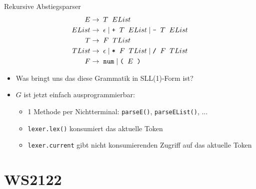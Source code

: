 \documentclass{beamer}
\begin{document}
\begin{frame}{Rekursive Abstiegsparser}
	\footnotesize
	\begin{align*}
		E     \to & \;\; T \;\; EList\\
		EList \to & \;\; \epsilon \mid \textrm{\texttt{+}} \;\; T \;\; EList \mid \textrm{\texttt{-}} \;\; T \;\; EList\\
		T     \to & \;\; F \;\; TList\\
		TList \to & \;\; \epsilon \mid \textrm{\texttt{*}} \;\; F \;\; TList \mid \textrm{\texttt{/}} \;\; F \;\; TList\\
		F \to & \;\; \textrm{\texttt{num}} \; | \; \textrm{\texttt{(}} \;\; E \;\; \textrm{\texttt{)}}
	\end{align*}
	\begin{itemize}
            \pause
            \item Was bringt uns das diese Grammatik in SLL(1)-Form ist?
            \pause
		\item $G$ ist jetzt einfach ausprogrammierbar:
		\begin{itemize}
			\item 1 Methode per Nichtterminal: \texttt{parseE()}, \texttt{parseEList()}, ...
			\item \texttt{lexer.lex()} konsumiert das aktuelle Token
			\item \texttt{lexer.current} gibt nicht konsumierenden Zugriff auf das aktuelle Token
		\end{itemize}
	\end{itemize}
\end{frame}

\section{WS2122}
\end{document}
